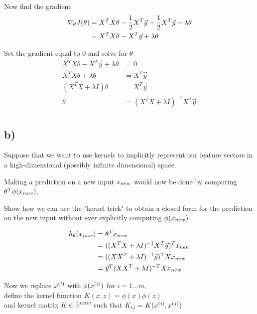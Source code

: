 \documentclass[11pt]{article}
\begin{document}
Now find the gradient
\begin{align*}
  \nabla_{\theta} J(\theta) &= X^{T} X \theta - \frac{1}{2} X^{T} \vec{y} - \frac{1}{2} X^{T} \vec{y} + \lambda \theta \\
  &= X^{T} X \theta - X^{T} \vec{y} + \lambda \theta \\
\end{align*}

Set the gradient equal to $0$ and solve for $\theta$
\begin{align*}
  X^{T} X \theta - X^{T} \vec{y} + \lambda \theta &= 0 \\
  X^{T} X \theta + \lambda \theta &= X^{T} \vec{y} \\
  (X^{T} X + \lambda I) \theta &= X^{T} \vec{y} \\
  \theta &= (X^{T} X + \lambda I)^{-1} X^{T} \vec{y} \\
\end{align*}

\subsection*{b)}

Suppose that we want to use kernels to implicitly represent our feature vectors in a high-dimensional (possibly infinite dimensional) space. 

Making a prediction on a new input $x_{new}$ would now be done by computing $\theta^{T} \phi(x_{new})$.

Show how we can use the "kernel trick" to obtain a closed form for the prediction on the new input without ever explicitly computing $\phi(x_{new})$.

\begin{align*}
  h_{\theta}(x_{new}) &= \theta^{T} x_{new} \\
             &= ((X^{T} X + \lambda I)^{-1} X^{T} \vec{y})^{T} x_{new} \\
             &= ((X X^{T} + \lambda I)^{-1} \vec{y})^{T} X x_{new} \\
             &= \vec{y}^{T} (X X^{T} + \lambda I)^{-T} X x_{new} \\
\end{align*}

Now we replace $x^{(i)}$ with $\phi(x^{(i)})$ for $i = 1...m$,\\
define the kernel function $K(x, z) = \phi(x) \phi(z)$ \\
and kernel matrix $K \in \mathbb{R}^{m x m}$ such that $K_{ij} = K(x^{(i)}, x^{(j)})$
\end{document}
